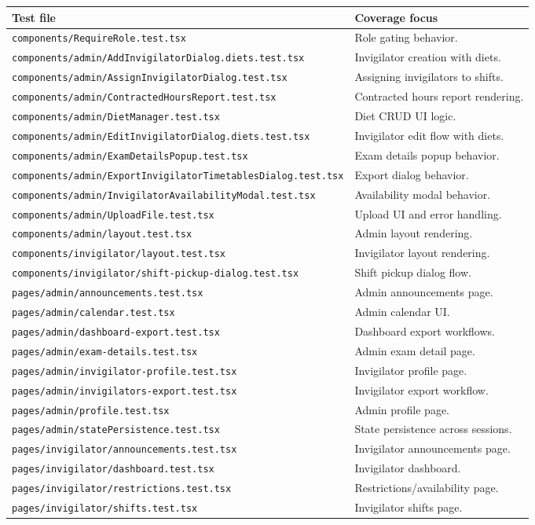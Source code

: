 \begin{longtable}{p{}p{}}
\toprule
\textbf{Test file} & \textbf{Coverage focus} \\
\midrule
\texttt{components/RequireRole.test.tsx} & Role gating behavior. \\
\texttt{components/admin/AddInvigilatorDialog.diets.test.tsx} & Invigilator creation with diets. \\
\texttt{components/admin/AssignInvigilatorDialog.test.tsx} & Assigning invigilators to shifts. \\
\texttt{components/admin/ContractedHoursReport.test.tsx} & Contracted hours report rendering. \\
\texttt{components/admin/DietManager.test.tsx} & Diet CRUD UI logic. \\
\texttt{components/admin/EditInvigilatorDialog.diets.test.tsx} & Invigilator edit flow with diets. \\
\texttt{components/admin/ExamDetailsPopup.test.tsx} & Exam details popup behavior. \\
\texttt{components/admin/ExportInvigilatorTimetablesDialog.test.tsx} & Export dialog behavior. \\
\texttt{components/admin/InvigilatorAvailabilityModal.test.tsx} & Availability modal behavior. \\
\texttt{components/admin/UploadFile.test.tsx} & Upload UI and error handling. \\
\texttt{components/admin/layout.test.tsx} & Admin layout rendering. \\
\texttt{components/invigilator/layout.test.tsx} & Invigilator layout rendering. \\
\texttt{components/invigilator/shift-pickup-dialog.test.tsx} & Shift pickup dialog flow. \\
\texttt{pages/admin/announcements.test.tsx} & Admin announcements page. \\
\texttt{pages/admin/calendar.test.tsx} & Admin calendar UI. \\
\texttt{pages/admin/dashboard-export.test.tsx} & Dashboard export workflows. \\
\texttt{pages/admin/exam-details.test.tsx} & Admin exam detail page. \\
\texttt{pages/admin/invigilator-profile.test.tsx} & Invigilator profile page. \\
\texttt{pages/admin/invigilators-export.test.tsx} & Invigilator export workflow. \\
\texttt{pages/admin/profile.test.tsx} & Admin profile page. \\
\texttt{pages/admin/statePersistence.test.tsx} & State persistence across sessions. \\
\texttt{pages/invigilator/announcements.test.tsx} & Invigilator announcements page. \\
\texttt{pages/invigilator/dashboard.test.tsx} & Invigilator dashboard. \\
\texttt{pages/invigilator/restrictions.test.tsx} & Restrictions/availability page. \\
\texttt{pages/invigilator/shifts.test.tsx} & Invigilator shifts page. \\
\bottomrule
\end{longtable}
